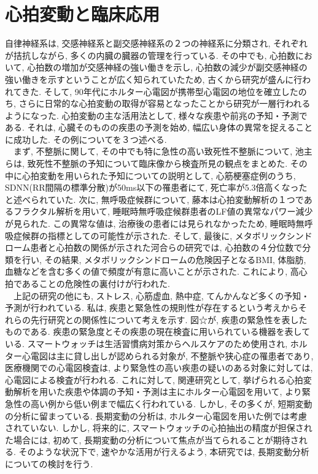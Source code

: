 \documentclass[report, 11pt, a4paper]{jsbook}
\begin{document}
\section{心拍変動と臨床応用}
自律神経系は, 交感神経系と副交感神経系の２つの神経系に分類され, それぞれが拮抗しながら, 多くの内臓の臓器の管理を行っている. その中でも, 心拍数において, 心拍数の増加が交感神経の強い働きを示し, 心拍数の減少が副交感神経の強い働きを示すということが広く知られていたため, 古くから研究が盛んに行われてきた. そして, 90年代にホルター心電図が携帯型心電図の地位を確立したのち, さらに日常的な心拍変動の取得が容易となったことから研究が一層行われるようになった. 心拍変動の主な活用法として, 様々な疾患や前兆の予知・予測である. それは, 心臓そのものの疾患の予測を始め, 幅広い身体の異常を捉えることに成功した. その例についてを３つ述べる. \\
　まず,  不整脈に関して, その中でも特に急性の高い致死性不整脈について, 池主らは, 致死性不整脈の予知について臨床像から検査所見の観点をまとめた. その中に心拍変動を用いられた予知についての説明として, 心筋梗塞症例のうち, SDNN(RR間隔の標準分散)が50ms以下の罹患者にて, 死亡率が5.3倍高くなったと述べられていた. 次に, 無呼吸症候群について, 藤本は心拍変動解析の１つであるフラクタル解析を用いて, 睡眠時無呼吸症候群患者のLF値の異常なパワー減少が見られた. この異常な値は, 治療後の患者には見られなかったため, 睡眠時無呼吸症候群の指標としての可能性が示された. そして, 最後に, メタボリックシンドローム患者と心拍数の関係が示された河合らの研究では, 心拍数の４分位数で分類を行い, その結果, メタボリックシンドロームの危険因子となるBMI, 体脂肪, 血糖などを含む多くの値で頻度が有意に高いことが示された. これにより, 高心拍であることの危険性の裏付けが行われた.\\
　上記の研究の他にも, ストレス, 心筋虚血, 熱中症, てんかんなど多くの予知・予測が行われている. 私は, 疾患と緊急性の規則性が存在するという考えからそれらの先行研究との関係性について考えを示す. 図☆が, 疾患の緊急性を表したものである. 疾患の緊急度とその疾患の現在検査に用いられている機器を表している. スマートウォッチは生活習慣病対策からヘルスケアのため使用され, ホルター心電図は主に貸し出しが認められる対象が, 不整脈や狭心症の罹患者であり, 医療機関での心電図検査は, より緊急性の高い疾患の疑いのある対象に対しては, 心電図による検査が行われる. これに対して, 関連研究として, 挙げられる心拍変動解析を用いた疾患や体調の予知・予測は主にホルター心電図を用いて, より緊急性の高い例から低い例まで幅広く行われている. しかし, その多くが, 短期変動の分析に留まっている. 長期変動の分析は, ホルター心電図を用いた例では考慮されていない. しかし, 将来的に, スマートウォッチの心拍抽出の精度が担保された場合には, 初めて, 長期変動の分析について焦点が当てられることが期待される. そのような状況下で, 速やかな活用が行えるよう, 本研究では, 長期変動分析についての検討を行う. 
\end{document}
